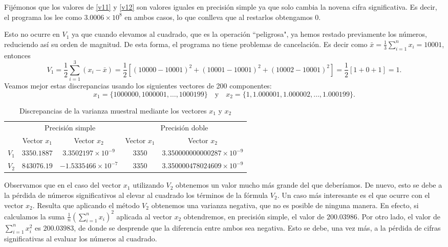 \documentclass[a4paper]{article}
\begin{document}
Fijémonos que los valores de \eqref{v11} y \eqref{v12} son valores iguales en precisión simple ya que solo cambia la novena cifra significativa. Es decir, el programa los lee como $3.0006\times10^8$ en ambos casos, lo que conlleva que al restarlos obtengamos 0.\par
Esto no ocurre en $V_{1}$ ya que cuando elevamos al cuadrado, que es la operación ``peligrosa", ya hemos restado previamente los números, reduciendo así su orden de magnitud. De esta forma, el programa no tiene problemas de cancelación. Es decir como $\bar{x}=\frac{1}{3}\sum_{i=1}^{n}x_{i}=10001$, entonces $$V_{1}=\frac{1}{2}\sum_{i=1}^{3}(x_i-\bar{x})=\frac{1}{2}\left[(10000-10001)^2+(10001-10001)^2+(10002-10001)^2\right]=\frac{1}{2}\left[1+0+1\right]=1.$$
Veamos mejor estas discrepancias usando los siguientes vectores de 200 componentes: $$x_{1}=\{1000000,1000001,\dots,1000199\}\quad\text{y}\quad x_{2}=\{1, 1.000001, 1.000002, \dots, 1.000199\}.$$\par
\begin{table}[ht]
	\centering
	\begin{tabular}{|c|c|c||c|c|}
	    \hline
	    & \multicolumn{2}{c||}{Precisión simple} & \multicolumn{2}{c|}{Precisión doble}\\
		\cline{2-5} 
		& Vector $x_{1}$ & Vector $x_{2}$ & Vector $x_{1}$ & Vector $x_{2}$\\
		\hline
		$V_{1}$ & $3350.1887$ & $3.3502197\times 10^{-9}$ & $3350$ & $3.350000000000287\times 10^{-9}$\\
		\hline
		$V_{2}$ & $843076.19$ & $-1.5335466\times 10^{-7}$ & $3350$ & $3.350000478024609\times 10^{-9}$\\
		\hline
	\end{tabular}
		\caption{Discrepancias de la varianza muestral mediante los vectores $x_{1}$ y $x_{2}$}
		\label{tab:12}
	\end{table}
Observamos que en el caso del vector $x_1$ utilizando $V_2$ obtenemos un valor mucho más grande del que deberíamos. De nuevo, esto se debe a la pérdida de números significativos al elevar al cuadrado los términos de la fórmula $V_2$. Un caso más interesante es el que ocurre con el vector $x_2$. Resulta que aplicando el método $V_2$ obtenemos una varianza negativa, que no es posible de ninguna manera. En efecto, si calculamos la suma $\frac{1}{n}\left(\sum_{i=1}^{n}x_{i}\right)^2$ aplicada al vector $x_2$ obtendremos, en precisión simple, el valor de $200.03986$. Por otro lado, el valor de $\sum_{i=1}^{n}x_{i}^2$ es $200.03983$, de donde se desprende que la diferencia entre ambos sea negativa. Esto se debe, una vez más, a la pérdida de cifras significativas al evaluar los números al cuadrado.
\newpage
\end{document}
